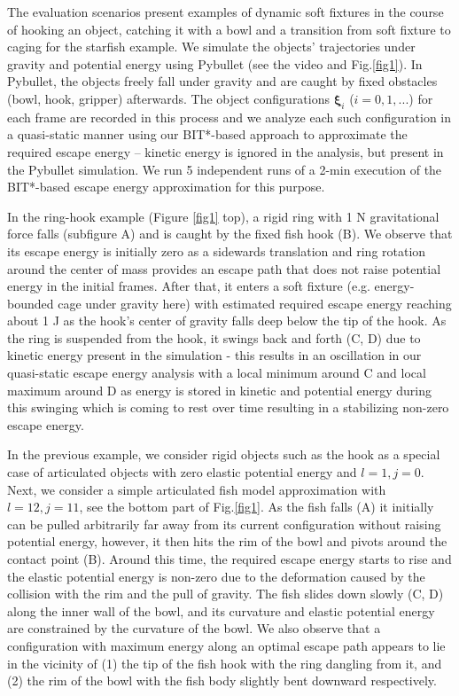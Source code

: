 \documentclass[conference]{IEEEtran}
\DeclareMathOperator*{\argmax}{arg\,max}
\newcommand{\bxi}{\boldsymbol{\xi}}
\begin{document}
The evaluation scenarios present examples of dynamic soft fixtures in the course of hooking an object, catching it with a bowl and a transition from soft fixture to caging for the starfish example. 
We simulate the objects' trajectories under gravity and potential energy using Pybullet (see the video and Fig.\ref{fig1}).
In Pybullet, the objects freely fall under gravity and are caught by fixed obstacles (bowl, hook, gripper) afterwards. The object configurations $\boldsymbol{\xi}_{i}$ ($i=0,1,...$) for each frame are recorded in this process and we analyze each such configuration in a quasi-static manner using our BIT*-based approach to approximate the required escape energy -- kinetic energy is ignored in the analysis, but present in the Pybullet simulation. We run 5 independent runs of a 2-min execution of the BIT*-based escape energy approximation for this purpose. 

In the ring-hook example (Figure \ref{fig1} top), a rigid ring with 1 N gravitational force falls (subfigure A) and is caught by the fixed fish hook (B).
We observe that its escape energy is initially zero as a sidewards translation and ring rotation around the center of mass provides an escape path that does not raise potential energy in the initial frames. After that, it enters a soft fixture (e.g. energy-bounded cage under gravity here) with estimated required escape energy reaching about 1 J as the hook's center of gravity falls deep below the tip of the hook. As the ring is suspended from the hook, it swings back and forth (C, D) due to kinetic energy present in the simulation - this results in an oscillation in our quasi-static escape energy analysis with a local minimum around C and local maximum around D as energy is stored in kinetic and potential energy during this swinging which is coming to rest over time resulting in a stabilizing non-zero escape energy.


In the previous example, we consider rigid objects such as the hook as a special case of articulated objects with zero elastic potential energy and  $l = 1, j = 0$. Next, we consider a simple articulated fish model approximation with $l = 12, j = 11$, see the bottom part of Fig.\ref{fig1}. As the fish falls (A) it initially can be pulled arbitrarily far away from its current configuration without raising potential energy, however, it then hits the rim of the bowl and pivots around the contact point (B). Around this time, the required escape energy starts to rise and the elastic potential energy is non-zero due to the deformation caused by the collision with the rim and the pull of gravity.
The fish slides down slowly (C, D) along the inner wall of the bowl, and its curvature and elastic potential energy are constrained by the curvature of the bowl.
We also observe that a configuration with maximum energy
along an optimal escape path appears to lie in the vicinity of (1) the tip of the fish hook with the ring dangling from it, and (2) the rim of the bowl with the fish body slightly bent downward respectively.
\end{document}
